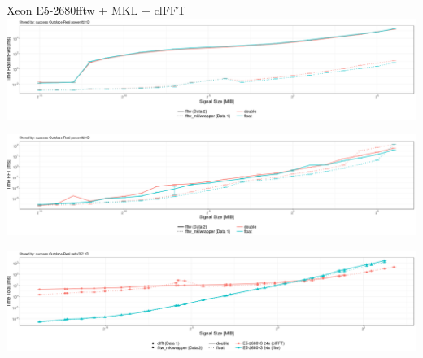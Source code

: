 \documentclass[t,11pt,hyperref={
  pdftitle = {gearshifft},
  pdfsubject = {gearshifft},
  pdfborder={0 0 0},
  colorlinks=true,
  urlcolor=red,
  citecolor=red,
  linkcolor=red,
  pdfauthor={Peter Steinbach, Matthias Werner}
  }
]{beamer}
\begin{document}
\begin{frame}{Xeon E5-2680}{fftw + MKL + clFFT}
\vspace{-0.5em} \hspace*{-2em}  \includegraphics[width=1.15\textwidth]{fftw-mkl.png}
  
\vspace{-2.1em} \hspace*{-2em}  \includegraphics[width=1.15\textwidth]{fftw-mkl-fft.png}

\vspace{-0.1em} \hspace*{-2em}  \includegraphics[width=1.15\textwidth]{clfft-mkl.png}
\end{frame}

  
  
  
\end{document}

